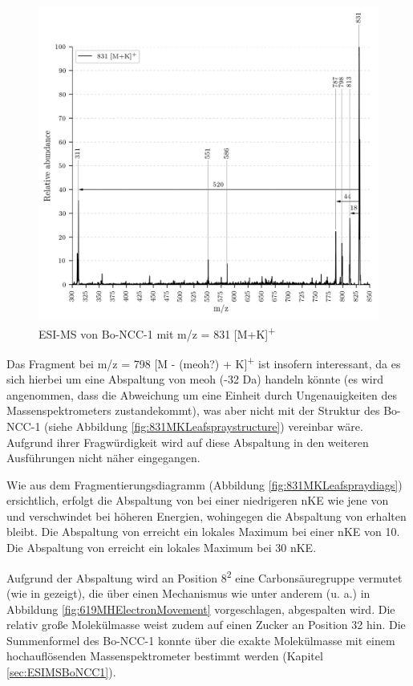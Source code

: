 \begin{figure}[!htbp]
  \includegraphics[width=\textwidth, height=0.7\textwidth]{figures/Kapitel4/Kataboliten/VWA_MS_LeafSpray_831.png}
  \caption[ESI-MS Spektrum von Bo-NCC-1, Quelle: Autor]{ESI-MS von Bo-NCC-1 mit m/z = 831 [M+K]\textsuperscript{+}}
  \label{fig:831MKLeafspray}
\end{figure}

Das Fragment bei m/z = 798 [M - (\gls{meoh}?) + K]\textsuperscript{+} ist insofern interessant, da es sich hierbei um eine Abspaltung von \gls{meoh} (-32 Da) handeln könnte (es wird angenommen, dass die Abweichung um eine Einheit durch Ungenauigkeiten des Massenspektrometers zustandekommt), was aber nicht mit der Struktur des Bo-NCC-1 (siehe Abbildung \ref{fig:831MKLeafspraystructure}) vereinbar wäre. Aufgrund ihrer Fragwürdigkeit wird auf diese Abspaltung in den weiteren Ausführungen nicht näher eingegangen.

Wie aus dem Fragmentierungsdiagramm (Abbildung \ref{fig:831MKLeafspraydiags}) ersichtlich, erfolgt die Abspaltung von  bei einer niedrigeren \gls{nKE} wie jene von  und verschwindet bei höheren Energien, wohingegen die Abspaltung von  erhalten bleibt. Die Abspaltung von  erreicht ein lokales Maximum bei einer \gls{nKE} von 10. Die Abspaltung von  erreicht ein lokales Maximum bei 30 \gls{nKE}.

Aufgrund der  Abspaltung wird an Position 8\textsuperscript{2} eine Carbonsäuregruppe vermutet (wie in \cite{StructureElucidation} gezeigt), die über einen Mechanismus wie unter anderem (u. a.) in Abbildung \ref{fig:619MHElectronMovement} vorgeschlagen, abgespalten wird. Die relativ große Molekülmasse weist zudem auf einen Zucker an Position 32 hin. Die Summenformel des Bo-NCC-1 konnte über die exakte Molekülmasse mit einem hochauflösenden Massenspektrometer bestimmt werden (Kapitel \ref{sec:ESIMSBoNCC1}).

